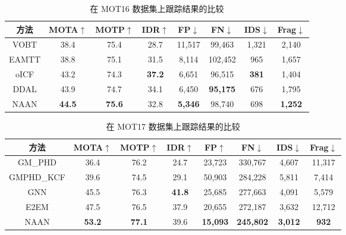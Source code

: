 \vspace{1.0em}
\renewcommand\arraystretch{1.5}
\begin{table}[htbp]\wuhao
	\centering
	\caption{在 MOT16 数据集上跟踪结果的比较}
	\vspace{0.3em}
	\begin{tabular}{c|ccccccc}
		\hline
		方法& MOTA$\uparrow$& MOTP$\uparrow$& IDR$\uparrow$& FP$ \downarrow $& FN$ \downarrow $& IDS$ \downarrow $& Frag$ \downarrow $ \\
		\hline
		VOBT\cite{b50}& 38.4& 75.4& 28.7& 11,517& 99,463& 1,321& 2,140 \\
		EAMTT\cite{b51}& 38.8& 75.1& 31.5& 8,114& 102,452& 965& 1,657 \\
		oICF\cite{b52}& 43.2& 74.3& {\textbf{37.2}}& 6,651& 96,515& {\textbf{381}}& 1,404 \\
		DDAL\cite{b24}& 43.9& 74.7& 34.1& 6,450& {\textbf{95,175}}& 676& 1,795 \\
		NAAN & {\textbf{44.5}}& {\textbf{75.6}}& 32.8& {\textbf{5,346}}& 98,740& 698& {\textbf{1,252}} \\
		\hline
	\end{tabular}
	\label{tab:nlaa_tracking_performance}
\end{table}


\vspace{1.0em}
\renewcommand\arraystretch{1.5}
\begin{table}[htbp]\wuhao
	\centering
	\caption{在 MOT17 数据集上跟踪结果的比较}
	\vspace{0.3em}
	\begin{tabular} {c|ccccccc}
		\hline
		方法& MOTA$ \uparrow $& MOTP$ \uparrow $& IDR$ \uparrow $& FP$ \uparrow $& FN$ \downarrow $& IDS$ \downarrow $& Frag$ \downarrow $ \\
		\hline
		GM\_PHD\cite{b50}& 36.4& 76.2& 24.7& 23,723& 330,767& 4,607& 11,317 \\
		GMPHD\_KCF\cite{b51}& 39.6& 74.5& 29.1& 50,903& 284,228& 5,811& 7,414 \\
		GNN\cite{b53}& 45.5& 76.3& \textbf{41.8}& 25,685& 277,663& 4,091& 5,579 \\
		E2EM\cite{b52}& 47.5& 76.5& 37.9& 20,655& 272,187& 3,632 & 12,712 \\
		NAAN & {\textbf{53.2}}& {\textbf{77.1}}& 39.6& {\textbf{15,093}}& \textbf{245,802}& {\textbf{3,012}}& {\textbf{932}} \\
		\hline		
	\end{tabular}
	\label{tab:nlaa_performance_MOT17}
\end{table}


